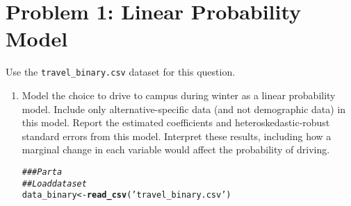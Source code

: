 \documentclass[11pt,letterpaper]{article}\usepackage[]{graphicx}\usepackage[]{color}
\makeatletter
\newcommand{\hlstr}[1]{\textcolor[rgb]{0.192,0.494,0.8}{#1}}%
\newcommand{\hlcom}[1]{\textcolor[rgb]{0.678,0.584,0.686}{\textit{#1}}}%
\newcommand{\hlstd}[1]{\textcolor[rgb]{0.345,0.345,0.345}{#1}}%
\newcommand{\hlkwb}[1]{\textcolor[rgb]{0.69,0.353,0.396}{#1}}%
\newcommand{\hlkwd}[1]{\textcolor[rgb]{0.737,0.353,0.396}{\textbf{#1}}}%
\newenvironment{kframe}{%
 \def\at@end@of@kframe{}%
 \ifinner\ifhmode%
  \def\at@end@of@kframe{\end{minipage}}%
  \begin{minipage}{\columnwidth}%
 \fi\fi%
 \def\FrameCommand##1{\hskip\@totalleftmargin \hskip-\fboxsep
 \colorbox{shadecolor}{##1}\hskip-\fboxsep
     \hskip-\linewidth \hskip-\@totalleftmargin \hskip\columnwidth}%
 \MakeFramed {\advance\hsize-\width
   \@totalleftmargin\z@ \linewidth\hsize
   \@setminipage}}%
 {\par\unskip\endMakeFramed%
 \at@end@of@kframe}
\newenvironment{knitrout}{}{} %
\makeatother
\begin{document}
\section*{Problem 1: Linear Probability Model}

Use the \texttt{travel\_binary.csv} dataset for this question.

\begin{enumerate}[label=\alph*., leftmargin=*]
	\item Model the choice to drive to campus during winter as a linear probability model. Include only alternative-specific data (and not demographic data) in this model. Report the estimated coefficients and heteroskedastic-robust standard errors from this model. Interpret these results, including how a marginal change in each variable would affect the probability of driving.

\begin{knitrout}
\color{fgcolor}\begin{kframe}
\begin{alltt}
\hlcom{### Part a}
\hlcom{## Load dataset}
\hlstd{data_binary} \hlkwb{<-} \hlkwd{read_csv}\hlstd{(}\hlstr{'travel_binary.csv'}\hlstd{)}
\end{alltt}



\end{kframe}
\end{knitrout}
\end{enumerate}
\end{document}
